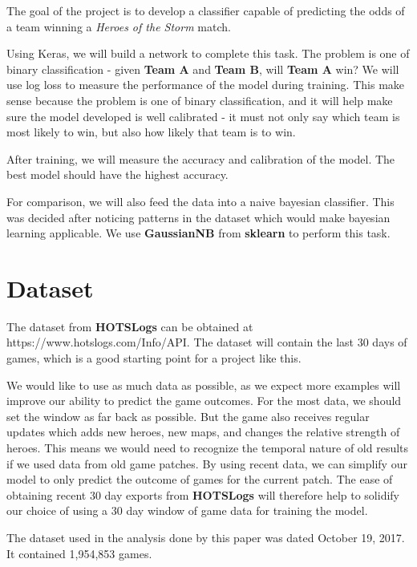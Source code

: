 \documentclass[twoside,twocolumn]{article}
\begin{document}
The goal of the project is to develop a classifier capable of predicting the odds of a team winning a \textit{Heroes of the Storm} match.

Using Keras, we will build a network to complete this task.  The problem is one of binary classification - given \textbf{Team A} and \textbf{Team B}, will \textbf{Team A} win?  We will use log loss to measure the performance of the model during training.  This make sense because the problem is one of binary classification, and it will help make sure the model developed is well calibrated - it must not only say which team is most likely to win, but also how likely that team is to win.

After training, we will measure the accuracy and calibration of the model.  The best model should have the highest accuracy.

For comparison, we will also feed the data into a naive bayesian classifier. This was decided after noticing patterns in the dataset which would make bayesian learning applicable.  We use \textbf{GaussianNB} from \textbf{sklearn} to perform this task.


\section{Dataset}

The dataset from \textbf{HOTSLogs} can be obtained at https://www.hotslogs.com/Info/API.  The dataset will contain the last 30 days of games, which is a good starting point for a project like this.  

We would like to use as much data as possible, as we expect more examples will improve our ability to predict the game outcomes.  For the most data, we should set the window as far back as possible.  But the game also receives regular updates which adds new heroes, new maps, and changes the relative strength of heroes.  This means we would need to recognize the temporal nature of old results if we used data from old game patches.  By using recent data, we can simplify our model to only predict the outcome of games for the current patch.  The ease of obtaining recent 30 day exports from \textbf{HOTSLogs} will therefore help to solidify our choice of using a 30 day window of game data for training the model.

The dataset used in the analysis done by this paper was dated October 19, 2017.  It contained 1,954,853 games.
\end{document}
